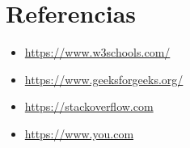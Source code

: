 \section{Referencias}
\begin{itemize}			
	\item \url{https://www.w3schools.com/}
	\item \url{https://www.geeksforgeeks.org/}
	\item \url{https://stackoverflow.com}
	\item \url{https://www.you.com}
\end{itemize}	
